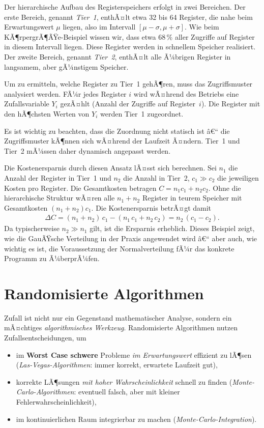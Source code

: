 ﻿\documentclass[12pt,a4paper]{article}
\theoremstyle{definition}
\theoremstyle{plain}
\theoremstyle{remark}
\begin{document}
Der hierarchische Aufbau des Registerspeichers erfolgt in zwei Bereichen. Der
erste Bereich, genannt \emph{Tier~1}, enthÃ¤lt etwa 32 bis 64 Register, die
nahe beim Erwartungswert $\mu$ liegen, also im Intervall
$[\mu - \sigma, \mu + \sigma]$. Wie beim KÃ¶rpergrÃ¶ÃŸe-Beispiel wissen wir,
dass etwa $68\,\%$ aller Zugriffe auf Register in diesem Intervall liegen.
Diese Register werden in schnellem Speicher realisiert. Der zweite Bereich,
genannt \emph{Tier~2}, enthÃ¤lt alle Ã¼brigen Register in langsamem, aber
gÃ¼nstigem Speicher.

Um zu ermitteln, welche Register zu Tier~1 gehÃ¶ren, muss das Zugriffsmuster
analysiert werden. FÃ¼r jedes Register $i$ wird wÃ¤hrend des Betriebs eine
Zufallsvariable $Y_i$ gezÃ¤hlt (Anzahl der Zugriffe auf Register~$i$). Die
Register mit den hÃ¶chsten Werten von $Y_i$ werden Tier~1 zugeordnet.

Es ist wichtig zu beachten, dass die Zuordnung nicht statisch ist â€“ die
Zugriffsmuster kÃ¶nnen sich wÃ¤hrend der Laufzeit Ã¤ndern. Tier~1 und Tier~2
mÃ¼ssen daher dynamisch angepasst werden.

Die Kostenersparnis durch diesen Ansatz lÃ¤sst sich berechnen. Sei $n_1$ die
Anzahl der Register in Tier~1 und $n_2$ die Anzahl in Tier~2, $c_1 \gg c_2$
die jeweiligen Kosten pro Register. Die Gesamtkosten betragen
$C = n_1 c_1 + n_2 c_2$. Ohne die hierarchische Struktur wÃ¤ren alle
$n_1 + n_2$ Register in teurem Speicher mit Gesamtkosten
$(n_1 + n_2) c_1$. Die Kostenersparnis betrÃ¤gt damit
\begin{align}
  \Delta C = (n_1 + n_2)\,c_1 - (n_1\,c_1 + n_2\,c_2) = n_2\,(c_1 - c_2).
\end{align}
Da typischerweise $n_2 \gg n_1$ gilt, ist die Ersparnis erheblich. Dieses
Beispiel zeigt, wie die GauÃŸsche Verteilung in der Praxis angewendet wird â€“
aber auch, wie wichtig es ist, die Voraussetzung der Normalverteilung fÃ¼r
das konkrete Programm zu Ã¼berprÃ¼fen.

\section{Randomisierte Algorithmen}
\label{sec:algorithmen}

Zufall ist nicht nur ein Gegenstand mathematischer Analyse, sondern ein
mÃ¤chtiges \emph{algorithmisches Werkzeug}. Randomisierte Algorithmen nutzen
Zufallsentscheidungen, um
\begin{itemize}
  \item im \textbf{Worst Case schwere} Probleme \emph{im Erwartungswert}
    effizient zu lÃ¶sen (\emph{Las-Vegas-Algorithmen}: immer korrekt,
    erwartete Laufzeit gut),
  \item korrekte LÃ¶sungen \emph{mit hoher Wahrscheinlichkeit} schnell zu
    finden (\emph{Monte-Carlo-Algorithmen}: eventuell falsch, aber mit
    kleiner Fehlerwahrscheinlichkeit),
  \item im kontinuierlichen Raum integrierbar zu machen
    (\emph{Monte-Carlo-Integration}).
\end{itemize}
\end{document}
